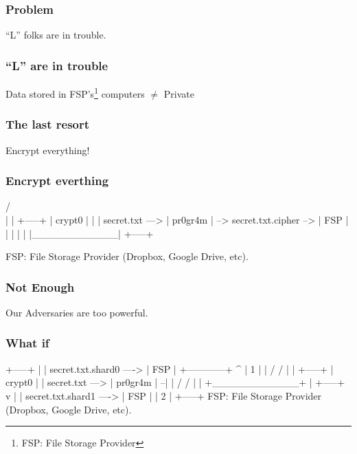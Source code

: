 \documentclass[17pt]{beamer}
\begin{document}
\begin{frame}
  \frametitle{Problem}
  \centering
  ``L'' folks are in trouble.
\end{frame}

\begin{frame}
  \frametitle{``L'' are in trouble}
  \centering
  Data stored in FSP's\footnote{FSP: File Storage Provider} computers $\ne$ Private
\end{frame}

\begin{frame}
  \frametitle{The last resort}
  \centering
  Encrypt everything!
\end{frame}

\begin{frame}[fragile]
  \frametitle{Encrypt everthing}
  {\tiny
  \begin{semiverbatim}
                        /^^^^^^^^^^^^\\
                        |            |                           +-----+
                        |  crypt0    |                           |     |
        secret.txt ---> |  pr0gr4m   | --> secret.txt.cipher --> | FSP |
                        |            |                           |     |
                        |____________|                           +-----+

     FSP: File Storage Provider (Dropbox, Google Drive, etc).
  \end{semiverbatim}
  }
\end{frame}


\begin{frame}
  \frametitle{Not Enough}
  \centering
  Our Adversaries are too powerful.
\end{frame}


\begin{frame}[fragile]
  \frametitle{What if}

  {\tiny
  \begin{semiverbatim}
                                                             +-----+
                                                             |     |
                                  secret.txt.shard0   ---->  | FSP |
                   +------------+   ^                        |  1  |
                   |  /     /   |   |                        +-----+
                   |  crypt0    |   |
   secret.txt ---> |  pr0gr4m   | --|
                   | /     /    |   |
                   +____________+   |                        +-----+
                                    v                        |     |
                                  secret.txt.shard1   ---->  | FSP |
                                                             |  2  |
                                                             +-----+
FSP: File Storage Provider (Dropbox, Google Drive, etc).
  \end{semiverbatim}
  }

\end{frame}
\end{document}
